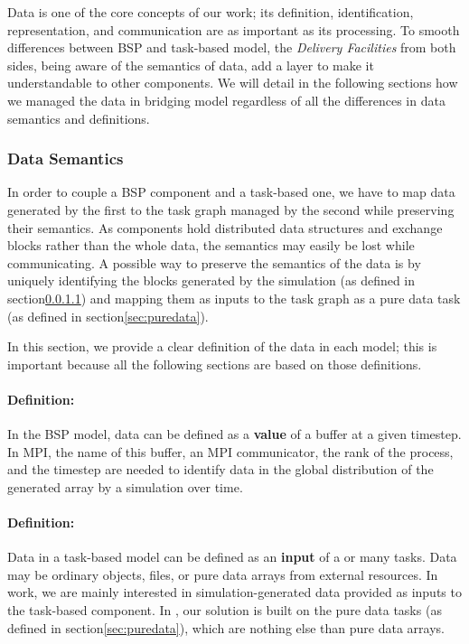 Data is one of the core concepts of our work; its definition, identification, representation, and communication are as important as its processing. To smooth  differences between BSP and task-based model, the \textit{Delivery Facilities} from both sides, being aware of the semantics of data, add a layer to make it understandable to other components. We will detail in the following sections how we managed the data in \deisa bridging model regardless of all the differences in data semantics and definitions.

\subsubsection{Data Semantics}\label{sec:datasemantic}

In order to couple a BSP component and a task-based one, we have to map data generated by the first to the task graph managed by the second while preserving their semantics. As \deisa components hold distributed data structures and exchange blocks rather than the whole data, the semantics may easily be lost while communicating.  
A possible way to preserve the semantics of the data is by uniquely identifying the blocks generated by the simulation (as defined in section\ref{defdataBSP}) and mapping them as inputs to the task graph as a pure data task (as defined in section\ref{sec:puredata}). 

In this section, we provide a clear definition of the data in each model; this is important because all the following sections are based on those definitions.

\paragraph{Definition:}\label{defdataBSP}
In the BSP model, data can be defined as a \textbf{value} of a buffer at a given timestep. In MPI, the name of this buffer, an MPI communicator, the rank of the process, and the timestep are needed to identify data in the global distribution of the generated array by a simulation over time. 

\paragraph{Definition:}\label{defdatataskbased}
Data in a task-based model can be defined as an \textbf{input} of a or many tasks. Data may be ordinary objects, files, or pure data arrays from external resources. In work, we are mainly interested in simulation-generated data provided as inputs to the task-based component. In \dask,  our solution is built on the pure data tasks (as defined in section\ref{sec:puredata}), which are nothing else than pure data arrays. 


